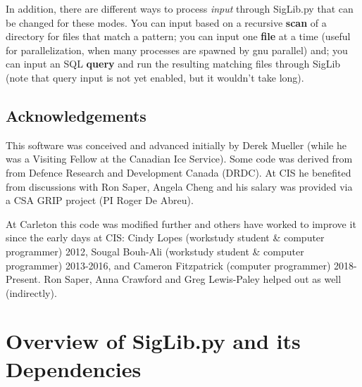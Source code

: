 \documentclass[letterpaper,10pt,openany,oneside]{sphinxmanual}
\begin{document}
In addition, there are different ways to process \emph{input} through
SigLib.py that can be changed for these modes. You can input based on a
recursive \textbf{scan} of a directory for files that match a pattern; you
can input one \textbf{file} at a time (useful for parallelization, when many
processes are spawned by gnu parallel) and; you can input an SQL
\textbf{query} and run the resulting matching files through SigLib (note that
query input is not yet enabled, but it wouldn't take long).


\section{Acknowledgements}
\label{intro:acknowledgements}
This software was conceived and advanced initially by Derek Mueller
(while he was a Visiting Fellow at the Canadian Ice Service). Some code
was derived from from Defence Research and Development Canada (DRDC). At
CIS he benefited from discussions with Ron Saper, Angela Cheng and his salary
was provided via a CSA GRIP project (PI Roger De Abreu).

At Carleton this code was modified further and others have worked to
improve it since the early days at CIS: Cindy Lopes (workstudy student \&
computer programmer) 2012, Sougal Bouh-Ali (workstudy student \& computer
programmer) 2013-2016, and Cameron Fitzpatrick (computer programmer) 2018-Present.
Ron Saper, Anna Crawford and Greg Lewis-Paley helped out as well (indirectly).


\chapter{Overview of SigLib.py and its Dependencies}
\label{project::doc}\label{project:overview-of-siglib-py-and-its-dependencies}
\end{document}
